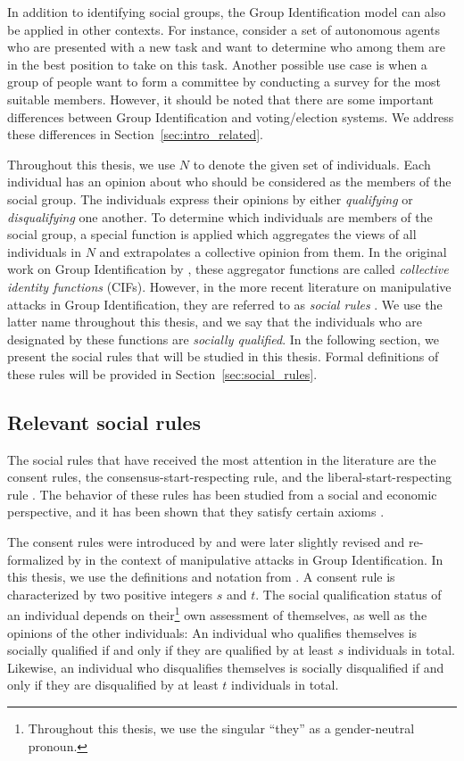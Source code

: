 \documentclass[
    12pt,               %
    a4paper,            %
    bibtotoc,           %
    pointlessnumbers,   %
    ngerman,            %
    titlepage,          %
    leqno,              %
    ]{scrarticle}       %
\newcommand\secref{Section~\ref}
\begin{document}
In addition to identifying social groups, the Group Identification model can also be applied in other contexts. For instance, consider a set of autonomous agents who are presented with a new task and want to determine who among them are in the best position to take on this task. Another possible use case is when a group of people want to form a committee by conducting a survey for the most suitable members. However, it should be noted that there are some important differences between Group Identification and voting/election systems. We address these differences in \secref{sec:intro_related}.

Throughout this thesis, we use $N$ to denote the given set of individuals. Each individual has an opinion about who should be considered as the members of the social group. The individuals express their opinions by either \emph{qualifying} or \emph{disqualifying} one another. To determine which individuals are members of the social group, a special function is applied which aggregates the views of all individuals in $N$ and extrapolates a collective opinion from them. In the original work on Group Identification by \textcite{KR97}, these aggregator functions are called \emph{collective identity functions} (CIFs). However, in the more recent literature on manipulative attacks in Group Identification, they are referred to as \emph{social rules} \cite{YD18,ERY20,BBKL20,J22}. We use the latter name throughout this thesis, and we say that the individuals who are designated by these functions are \emph{socially qualified}. In the following section, we present the social rules that will be studied in this thesis. Formal definitions of these rules will be provided in \secref{sec:social_rules}.



\subsection{Relevant social rules}
\label{sec:intro_social_rules}

The social rules that have received the most attention in the literature are the consent rules, the consensus-start-respecting rule, and the liberal-start-respecting rule \cite{YD18,ERY20,BBKL20,J22}. The behavior of these rules has been studied from a social and economic perspective, and it has been shown that they satisfy certain axioms \cite{SS03,DSX07,M08,N07,D11}.

The consent rules were introduced by \textcite{SS03} and were later slightly revised and re-formalized by \textcite{YD18} in the context of manipulative attacks in Group Identification. In this thesis, we use the definitions and notation from \textcite{YD18}. A consent rule is characterized by two positive integers $s$ and $t$. The social qualification status of an individual depends on their\footnote{Throughout this thesis, we use the singular ``they'' as a gender-neutral pronoun.} own assessment of themselves, as well as the opinions of the other individuals: An individual who qualifies themselves is socially qualified if and only if they are qualified by at least $s$ individuals in total. Likewise, an individual who disqualifies themselves is socially disqualified if and only if they are disqualified by at least $t$ individuals in total.
\end{document}
